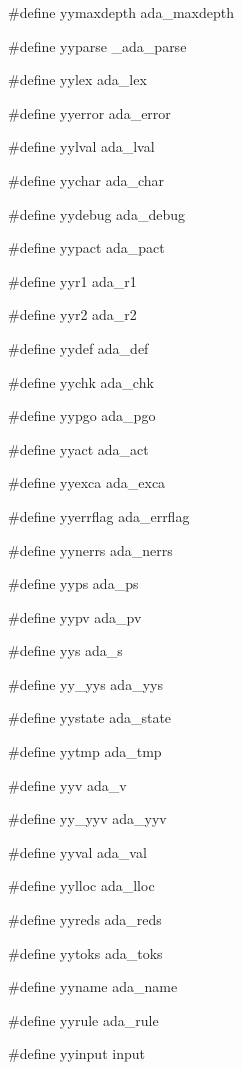 \medskip
{\stt \#define yymaxdepth ada\_maxdepth}

\medskip
{\stt \#define yyparse \_ada\_parse}

\medskip
{\stt \#define yylex ada\_lex}

\medskip
{\stt \#define yyerror ada\_error}

\medskip
{\stt \#define yylval ada\_lval}

\medskip
{\stt \#define yychar ada\_char}

\medskip
{\stt \#define yydebug ada\_debug}

\medskip
{\stt \#define yypact ada\_pact}

\medskip
{\stt \#define yyr1 ada\_r1}

\medskip
{\stt \#define yyr2 ada\_r2}

\medskip
{\stt \#define yydef ada\_def}

\medskip
{\stt \#define yychk ada\_chk}

\medskip
{\stt \#define yypgo ada\_pgo}

\medskip
{\stt \#define yyact ada\_act}

\medskip
{\stt \#define yyexca ada\_exca}

\medskip
{\stt \#define yyerrflag ada\_errflag}

\medskip
{\stt \#define yynerrs ada\_nerrs}

\medskip
{\stt \#define yyps ada\_ps}

\medskip
{\stt \#define yypv ada\_pv}

\medskip
{\stt \#define yys ada\_s}

\medskip
{\stt \#define yy\_yys ada\_yys}

\medskip
{\stt \#define yystate ada\_state}

\medskip
{\stt \#define yytmp ada\_tmp}

\medskip
{\stt \#define yyv ada\_v}

\medskip
{\stt \#define yy\_yyv ada\_yyv}

\medskip
{\stt \#define yyval ada\_val}

\medskip
{\stt \#define yylloc ada\_lloc}

\medskip
{\stt \#define yyreds ada\_reds}

\medskip
{\stt \#define yytoks ada\_toks}

\medskip
{\stt \#define yyname ada\_name}

\medskip
{\stt \#define yyrule ada\_rule}

\medskip
{\stt \#define yyinput input}

